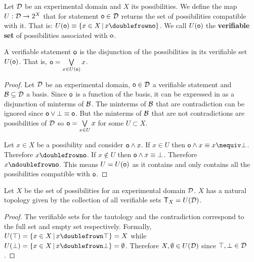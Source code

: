 \documentclass[11pt,letterpaper,fleqn]{memoir} %
\begin{document}
\begin{mathSection}
	
\begin{defn}
	Let $\mathcal{D}$ be an experimental domain and $X$ its possibilities. We define the map $U : \mathcal{D} \rightarrow 2^X$ that for statement $\mathsf{o} \in \mathcal{D}$ returns the set of possibilities compatible with it. That is: $U(\obs)\equiv\{ x \in X \, | \, x \comp \obs\}$. We call $U(\mathsf{o})$ the \textbf{verifiable set} of possibilities associated with $\mathsf{o}$.
\end{defn}

\begin{prop}
	A verifiable statement $\mathsf{o}$ is the disjunction of the possibilities in its verifiable set $U(\mathsf{o})$. That is, $\mathsf{o}=\bigvee\limits_{x \in U(\mathsf{o})} x$.
\end{prop}
\begin{proof}
	Let $\mathcal{D}$ be an experimental domain, $\mathsf{o} \in \mathcal{D}$ a verifiable statement and $\mathcal{B} \subseteq \mathcal{D}$ a basis. Since $\mathsf{o}$ is a function of the basis, it can be expressed in as a disjunction of minterms of $\mathcal{B}$. The minterms of $\mathcal{B}$ that are contradiction can be ignored since $\mathsf{o} \vee \bot \equiv \mathsf{o}$. But the minterms of $\mathcal{B}$ that are not contradictions are possibilities of $\mathcal{D}$ so $\mathsf{o}=\bigvee\limits_{x \in U} x$ for some $U \subset X$.
	
	Let $x \in X$ be a possibility and consider $\mathsf{o} \wedge x$. If $x\in U$ then $\obs \AND x \equiv x \nequiv \contradiction$. Therefore $x \comp \obs$. If $x \notin U$ then $\mathsf{o} \wedge x \equiv \bot$. Therefore $x \ncomp \obs$. This means $U=U(\mathsf{o})$ as it contains and only contains all the possibilities compatible with $\mathsf{o}$.
\end{proof}

\begin{prop}
	Let $X$ be the set of possibilities for an experimental domain $\mathcal{D}$. $X$ has a natural topology given by the collection of all verifiable sets $\mathsf{T}_X=U(\mathcal{D})$.
\end{prop}

\begin{proof}
	The verifiable sets for the tautology and the contradiction correspond to the full set and empty set respectively. Formally, $U(\tautology) = \{ x \in X \, | \, x \comp \tautology\} = X$ while $U(\contradiction) = \{ x \in X \, | \, x \comp \contradiction\} = \emptyset$. Therefore $X, \emptyset \in U(\mathcal{D})$ since $\top, \bot \in \mathcal{D}$.


\end{proof}
\end{mathSection}
\end{document}
